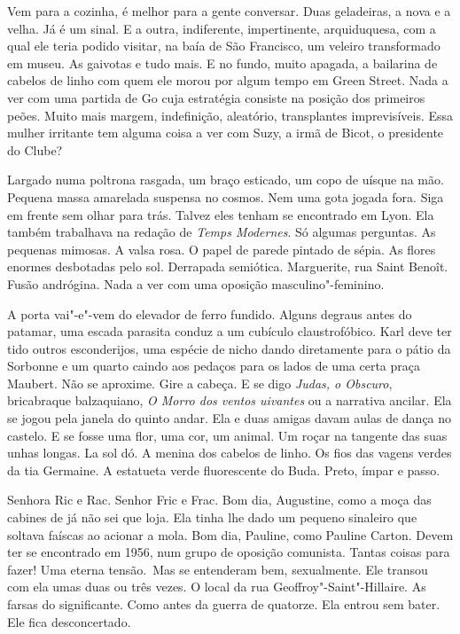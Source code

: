 Vem para a cozinha, é melhor para a gente conversar. Duas geladeiras, a
nova e a velha. Já é um sinal. E a outra, indiferente, impertinente,
arquiduquesa, com a qual ele teria podido visitar, na baía de São
Francisco, um veleiro transformado em museu. As gaivotas e tudo mais. E
no fundo, muito apagada, a bailarina de cabelos de linho com quem ele
morou por algum tempo em Green Street. Nada a ver com uma partida de Go
cuja estratégia consiste na posição dos primeiros peões. Muito mais
margem, indefinição, aleatório, transplantes imprevisíveis. Essa mulher
irritante tem alguma coisa a ver com Suzy, a irmã de Bicot, o presidente
do Clube?

Largado numa poltrona rasgada, um braço esticado, um copo de uísque na
mão. Pequena massa amarelada suspensa no cosmos. Nem uma gota jogada
fora. Siga em frente sem olhar para trás. Talvez eles tenham se
encontrado em Lyon. Ela também trabalhava na redação de \emph{Temps
Modernes}. Só algumas perguntas. As pequenas mimosas. A valsa rosa. O
papel de parede pintado de sépia. As flores enormes desbotadas pelo sol.
Derrapada semiótica. Marguerite, rua Saint Benoît. Fusão andrógina. Nada
a ver com uma oposição masculino"-feminino.

A porta vai"-e"-vem do elevador de ferro fundido. Alguns degraus antes do
patamar, uma escada parasita conduz a um cubículo claustrofóbico. Karl
deve ter tido outros esconderijos, uma espécie de nicho dando
diretamente para o pátio da Sorbonne e um quarto caindo aos pedaços para
os lados de uma certa praça Maubert. Não se aproxime. Gire a cabeça. E
se digo \emph{Judas, o Obscuro}, bricabraque balzaquiano, \emph{O Morro
dos ventos uivantes} ou a narrativa ancilar. Ela se jogou pela janela do
quinto andar. Ela e duas amigas davam aulas de dança no castelo. E se
fosse uma flor, uma cor, um animal. Um roçar na tangente das suas unhas
longas. La sol dó. A menina dos cabelos de linho. Os fios das vagens %
verdes da tia Germaine. A estatueta verde fluorescente do Buda. Preto,
ímpar e passo.

Senhora Ric e Rac. Senhor Fric e Frac. Bom dia, Augustine, como a moça
das cabines de já não sei que loja. Ela tinha lhe dado um pequeno
sinaleiro que soltava faíscas ao acionar a mola. Bom dia, Pauline, como
Pauline Carton. Devem ter se encontrado em 1956, num grupo de oposição
comunista. Tantas coisas para fazer! Uma eterna tensão.~Mas se
entenderam bem, sexualmente. Ele transou com ela umas duas ou três
vezes. O local da rua Geoffroy"-Saint"-Hillaire. As farsas do
significante. Como antes da guerra de quatorze. Ela entrou sem bater.
Ele fica desconcertado.

